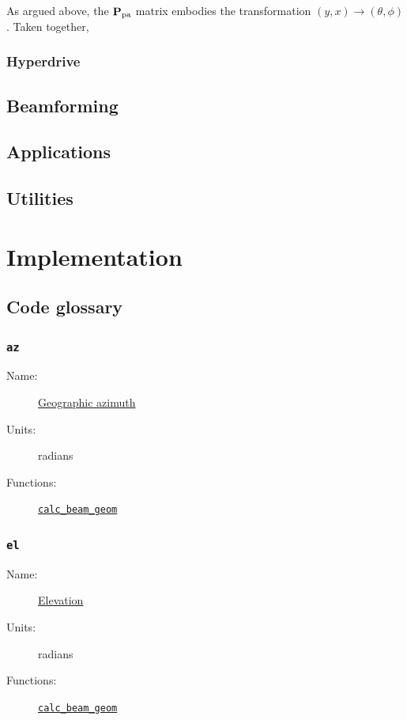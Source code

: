 \documentclass{book}
\newcommand{\pamat}{\ensuremath{{\bf P}_\text{pa}}}
\begin{document}
As argued above, the $\pamat$ matrix embodies the transformation $(y,x)\rightarrow(\theta,\phi)$.
Taken together, 

\subsection{Hyperdrive}

\section{Beamforming}

\section{Applications}

\section{Utilities}

\chapter{Implementation}

\section{Code glossary}

\subsection{\texttt{az}}
\begin{description}
    \item[Name:] \hyperlink{sec:coordslocalsky}{Geographic azimuth}
    \item[Units:] radians
    \item[Functions:] \hyperlink{cn:calc_beam_geom}{\texttt{calc\_beam\_geom}}
\end{description}

\subsection{\texttt{el}}
\begin{description}
    \item[Name:] \hyperlink{sec:coordslocalsky}{Elevation}
    \item[Units:] radians
    \item[Functions:] \hyperlink{cn:calc_beam_geom}{\texttt{calc\_beam\_geom}}
\end{description}
\end{document}
